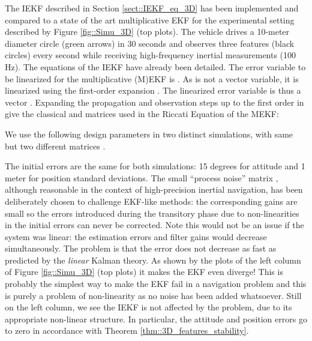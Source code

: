 \documentclass[a4paper,12pt,onecolumn]{article}
\begin{document}
The IEKF described in Section \ref{sect::IEKF_eq_3D} has been implemented and compared to a state of the art multiplicative EKF \cite{lefferts1982kalman} for the experimental setting described by Figure \ref{fig::Simu_3D} (top plots). The vehicle drives a 10-meter diameter circle (green arrows) in 30 seconds and observes three features (black circles) every second while receiving high-frequency inertial measurements (100 Hz).  The equations of the IEKF have already been detailed. The error variable to be linearized for the multiplicative (M)EKF is . As  is not a vector variable,  it is linearized using the first-order expansion   \cite{lefferts1982kalman}. The linearized error variable is thus a vector . Expanding the propagation and observation steps up to the first order in  give the classical  and  matrices used in the Riccati Equation of the MEKF:
 

We use the following design parameters in two distinct simulations, with same  but two different matrices .


The initial errors are the same for both simulations:  15 degrees for attitude and  1 meter for position standard deviations. The small ``process noise'' matrix , although reasonable in the context of high-precision inertial navigation, has been deliberately chosen to challenge EKF-like methods: the corresponding gains are small so  the errors introduced during the transitory phase due to non-linearities in the initial errors can never be corrected. Note this would not be an issue if the system was linear: the estimation errors and filter gains would decrease simultaneously. The problem is that the error does not decrease as fast as predicted by the \emph{linear} Kalman theory. As shown by the plots of the left column of Figure \ref{fig::Simu_3D} (top plots) it makes the EKF even diverge! This is probably the simplest way to  make the EKF fail in a navigation problem and this is purely a problem of  non-linearity as no noise has been added  whatsoever. Still on the left column, we see the IEKF is not affected by the problem, due to its appropriate non-linear structure. In particular, the attitude and position errors go to zero in accordance with Theorem \ref{thm::3D_features_stability}.
\end{document}
